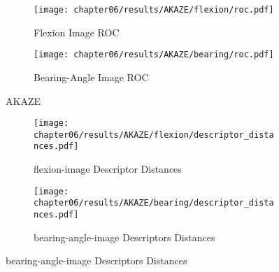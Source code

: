 \begin{figure}[H]
\begin{subfigure}[t]{0.45\linewidth}
    \texttt{[image: chapter06/results/AKAZE/flexion/roc.pdf]}%
    \caption{Flexion Image ROC}
\end{subfigure}\quad
\begin{subfigure}[t]{0.45\linewidth}
    \texttt{[image: chapter06/results/AKAZE/bearing/roc.pdf]}
    \caption{Bearing-Angle Image ROC}
\end{subfigure}
    \caption{AKAZE}
\end{figure}

\begin{figure}[H]
\begin{subfigure}[t]{0.45\linewidth}
    \texttt{[image: chapter06/results/AKAZE/flexion/descriptor\_distances.pdf]}%
    \caption{\gls{flexion-image} Descriptor Distances}
\end{subfigure}\quad
\begin{subfigure}[t]{0.45\linewidth}
    \texttt{[image: chapter06/results/AKAZE/bearing/descriptor\_distances.pdf]}%
    \caption{\gls{bearing-angle-image} Descriptors Distances}
\end{subfigure}
\end{figure}
